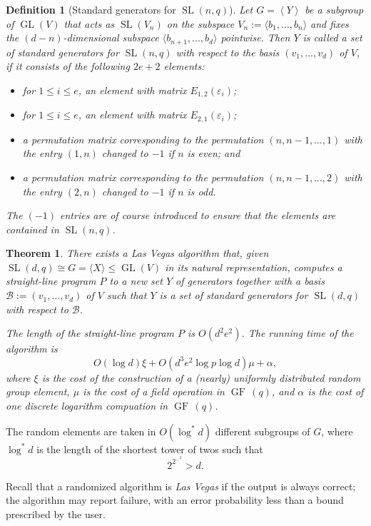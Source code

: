 \documentclass[a4paper,11pt]{article}
\def\GF{\operatorname{GF\,}}
\def\GL{\operatorname{GL}}
\def\SL{\operatorname{SL}}
\newcommand{\B}{\mathcal{B}}
\newtheorem{theorem}{Theorem}
\newtheorem{definition}{Definition}
\begin{document}
\begin{definition}[Standard generators for $\SL(n,q)$]
{\em
Let $G = \left< Y \right>$ be a subgroup of $\GL(V)$ that 
acts as $\SL(V_n)$ on the subspace $V_n:=\langle b_1,\ldots,b_n \rangle$ and 
fixes the $(d-n)$-dimensional subspace $\langle b_{n+1},\ldots,b_d\rangle$ pointwise.
Then $Y$ is called a \emph{set of standard generators for
$\SL(n,q)$ with respect to the basis $(v_1, \ldots, v_d)$} of $V$, 
if it consists of the following  $2e+2$ elements:
\begin{itemize}
\item for $1 \le i \le e$, an element with matrix $E_{1,2}(\varepsilon_i)$;
\item for $1 \le i \le e$, an element with matrix $E_{2,1}(\varepsilon_i)$;
\item a permutation matrix corresponding to the permutation
$(n,n-1,\ldots,1)$ with the entry $(1,n)$ changed to $-1$ if $n$ is
even; and
\item a permutation matrix corresponding to the permutation
$(n,n-1,\ldots,2)$ with the entry $(2,n)$ changed to $-1$ if $n$ is
odd.
\end{itemize}
The $(-1)$ entries are of course introduced to ensure that the elements are
contained in $\SL(n,q)$.
}
\end{definition}

\begin{theorem}
\label{main}
There exists a Las Vegas algorithm that, given $\SL(d,q) \cong G 
= \langle X \rangle
\le \GL(V)$ in its natural representation, computes a straight-line
program $P$ to a new set $Y$ of generators together with a basis
$\B := (v_1, \ldots, v_d)$ of $V$
such that $Y$ is a set of standard generators for $\SL(d,q)$ with 
respect to $\B$.

The length of the straight-line program $P$ is $O(d^2e^2)$. The running
time of the algorithm is
\[
O(\log d) \xi  +O(d^3e^2 \log p \log d)\mu +\alpha,
\]
where $\xi$ is the cost of the construction of a (nearly) uniformly
distributed random group element, $\mu$ is the cost of a field operation
in $\GF(q)$, and $\alpha$ is the cost of one discrete logarithm
compuation in $\GF(q)$.
\end{theorem}

The random elements are taken in $O(\log^*d)$ different subgroups of
$G$, where $\log^*d$ is the length of the shortest tower of twos such
that \[2^{2^{\cdots ^2}} >d.\]

Recall that a randomized algorithm is {\em Las Vegas} if the output
is always correct; the algorithm may report failure, with an error
probability less than a bound prescribed by the user.
\end{document}
